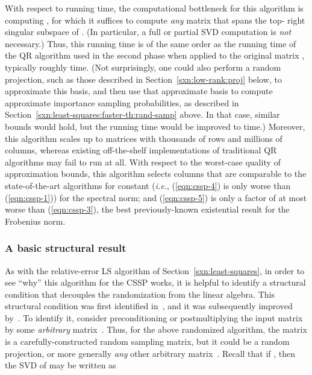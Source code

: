 \documentclass[twoside]{article}
\begin{document}
With respect to running time, the computational bottleneck for this 
algorithm is computing , for which it suffices to 
compute \emph{any}  matrix  that spans the top- right 
singular subspace of .
(In particular, a full or partial SVD computation is \emph{not} necessary.)
Thus, this running time is of the same order as the running time of the QR 
algorithm used in the second phase when applied to the original matrix , 
typically roughly  time.
(Not surprisingly, one could also perform a random projection, such as 
those described in Section~\ref{sxn:low-rank:proj} below, to approximate 
this basis, and then use that approximate basis to compute approximate 
importance sampling probabilities, as described in 
Section~\ref{sxn:least-squares:faster-th:rand-samp} above.  In that case, 
similar bounds would hold, but the running time would be improved to 
 time.)
Moreover, this algorithm scales up to matrices with thousands of rows and 
millions of columns, whereas existing off-the-shelf implementations of 
traditional QR algorithms may fail to run at all.
With respect to the worst-case quality of approximation bounds, this 
algorithm selects columns that are comparable to the state-of-the-art 
algorithms for constant  (\emph{i.e.}, (\ref{eqn:cssp-4}) is only
 worse than (\ref{eqn:cssp-1})) for the spectral norm; 
and (\ref{eqn:cssp-5}) is only a factor of at most  
worse than (\ref{eqn:cssp-3}), the best previously-known existential result 
for the Frobenius norm.



\subsubsection{A basic structural result}

As with the relative-error LS algorithm of Section~\ref{sxn:least-squares}, 
in order to see ``why'' this algorithm for the CSSP works, it is helpful to 
identify a structural condition that decouples the randomization from the 
linear algebra.
This structural condition was first identified 
in~\cite{BMD09_CSSP_SODA,BMD08_CSSP_TRv2}, and it was subsequently improved 
by~\cite{HMT09_SIREV}.
To identify it, consider preconditioning or postmultiplying the input matrix 
 by some \emph{arbitrary} matrix~.
Thus, for the above randomized algorithm, the matrix  is a 
carefully-constructed random sampling matrix, but it could be a random 
projection, or more generally \emph{any} other arbitrary matrix~.
Recall that if , then the SVD of  may be 
written as
\end{document}
